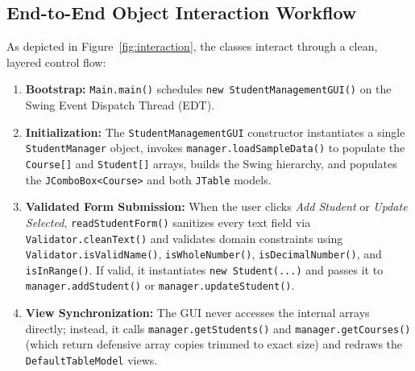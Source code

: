 \documentclass[10pt,a4paper]{article}
\begin{document}
\subsection{End-to-End Object Interaction Workflow}
{\small
As depicted in Figure~\ref{fig:interaction}, the classes interact through a clean, layered control flow:
\begin{enumerate}[leftmargin=0.4cm, itemsep=0pt, topsep=0.5pt]
    \item \textbf{Bootstrap:} \texttt{Main.main()} schedules \texttt{new StudentManagementGUI()} on the Swing Event Dispatch Thread (EDT).
    \item \textbf{Initialization:} The \texttt{StudentManagementGUI} constructor instantiates a single \texttt{StudentManager} object, invokes \texttt{manager.loadSampleData()} to populate the \texttt{Course[]} and \texttt{Student[]} arrays, builds the Swing hierarchy, and populates the \texttt{JComboBox<Course>} and both \texttt{JTable} models.
    \item \textbf{Validated Form Submission:} When the user clicks \textit{Add Student} or \textit{Update Selected}, \texttt{readStudentForm()} sanitizes every text field via \texttt{Validator.cleanText()} and validates domain constraints using \texttt{Validator.isValidName()}, \texttt{isWholeNumber()}, \texttt{isDecimalNumber()}, and \texttt{isInRange()}. If valid, it instantiates \texttt{new Student(...)} and passes it to \texttt{manager.addStudent()} or \texttt{manager.updateStudent()}.
    \item \textbf{View Synchronization:} The GUI never accesses the internal arrays directly; instead, it calls \texttt{manager.getStudents()} and \texttt{manager.getCourses()} (which return defensive array copies trimmed to exact size) and redraws the \texttt{DefaultTableModel} views.
\end{enumerate}\par}
\end{document}
